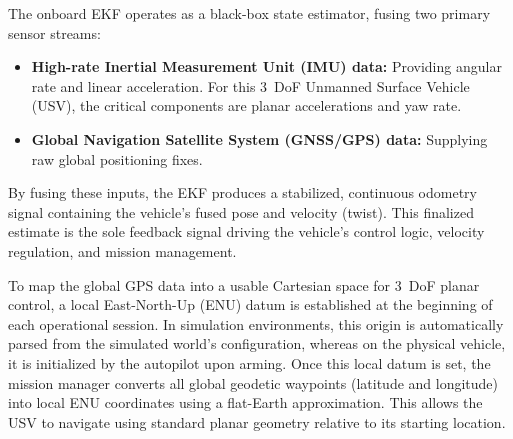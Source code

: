 The onboard EKF operates as a black-box state estimator, fusing two primary sensor streams:
\begin{itemize}
    \item \textbf{High-rate Inertial Measurement Unit (IMU) data:} Providing angular rate and linear acceleration. For this 3~DoF Unmanned Surface Vehicle (USV), the critical components are planar accelerations and yaw rate. 
    \item \textbf{Global Navigation Satellite System (GNSS/GPS) data:} Supplying raw global positioning fixes.
\end{itemize}

By fusing these inputs, the EKF produces a stabilized, continuous odometry signal containing the vehicle's fused pose and velocity (twist). This finalized estimate is the sole feedback signal driving the vehicle's control logic, velocity regulation, and mission management. 

To map the global GPS data into a usable Cartesian space for 3~DoF planar control, a local East-North-Up (ENU) datum is established at the beginning of each operational session. In simulation environments, this origin is automatically parsed from the simulated world's configuration, whereas on the physical vehicle, it is initialized by the autopilot upon arming. Once this local datum is set, the mission manager converts all global geodetic waypoints (latitude and longitude) into local ENU coordinates using a flat-Earth approximation. This allows the USV to navigate using standard planar geometry relative to its starting location.

\begin{center}
\end{center}

